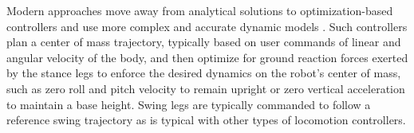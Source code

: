 Modern approaches move away from analytical solutions to optimization-based controllers and use more complex and accurate dynamic models \cite{bledtMITCheetah32018, dicarloDynamicLocomotionMIT2018, kolvenbachTraversingSteepGranular2021, huConstrainedModelPredictive2019, oshinDifferentiableRobustModel2024, grandiaDesignControlBipedal2024, parkOnlinePlanningAutonomous2015, bledtPolicyRegularizedModel, dingRealtimeModelPredictive2019, nosratiRegularizedModelPredictive2025, wieberTrajectoryFreeLinear2006, herdtWalkingThinkingIt2010, prattVirtualModelControl1995, hutterSTARLETHCOMPLIANTQUADRUPEDAL2012, xieIntuitiveApproachQuadruped2015, kocoHybridComplianceControl2019, liuResearchPostureControl2020, torresVirtualModelControl, chenVirtualModelControl2020}. Such controllers plan a center of mass trajectory, typically based on user commands of linear and angular velocity of the body, and then optimize for ground reaction forces exerted by the stance legs to enforce the desired dynamics on the robot's center of mass, such as zero roll and pitch velocity to remain upright or zero vertical acceleration to maintain a base height. Swing legs are typically commanded to follow a reference swing trajectory as is typical with other types of locomotion controllers. 

